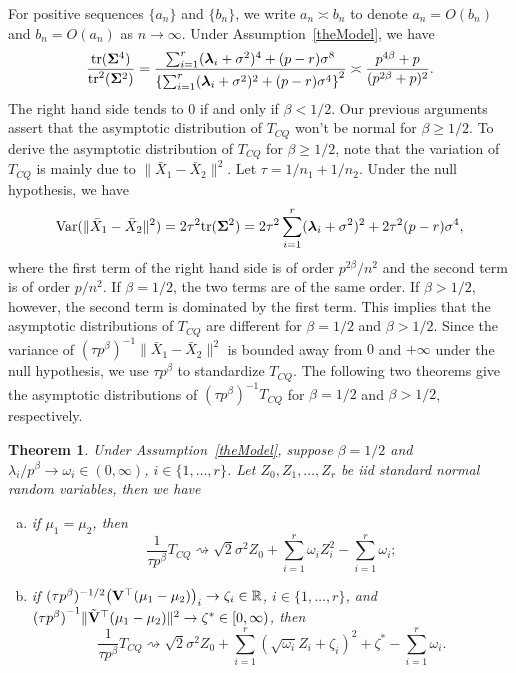 \documentclass[times,sort&compress,3p]{elsarticle}
\newcommand{\mytr}{ {\rm tr} }
\newcommand{\myVar}{ {\rm Var} }
\newcommand{\bfsym}[1]{\ensuremath{\boldsymbol{#1}}}
\def\blambda {\bfsym {\lambda}}        \def\bLambda {\bfsym {\Lambda}}
\theoremstyle{plain}
\newtheorem{theorem}{\quad\quad Theorem}
\theoremstyle{definition}
\theoremstyle{remark}
\begin{document}
For positive sequences $\{a_n\}$ and $\{b_n\}$, we write $a_n\asymp b_n$ to denote $a_n=O(b_n)$ and $b_n=O(a_n)$ as $n\to \infty$.
Under Assumption~\ref{theModel}, we have
$$
\frac{\mytr(\bSigma^4)}{\mytr^2(\bSigma^2)}
=
\frac{\sum_{i=1}^r (\blambda_i+\sigma^2)^4+(p-r)\sigma^8}{\left\{\sum_{i=1}^r (\blambda_i+\sigma^2)^2+(p-r)\sigma^4\right\}^2}
\asymp 
\frac{p^{4\beta}+p}{(p^{2\beta}+p)^2}.
$$
The right hand side tends to $0$ if and only if $\beta<1/2$.
Our previous arguments assert that the asymptotic distribution of $T_{CQ}$ won't be normal for $\beta\geq 1/2$.
To derive the asymptotic distribution of $T_{CQ}$ for $\beta\geq 1/2$,
note that the variation of $T_{CQ}$ is mainly due to $\|\bar{X}_1-\bar{X}_2\|^2$.
Let $\tau=1/n_1+1/n_2$.
Under the null hypothesis, we have
$$
\myVar(\|\bar{X}_1-\bar{X}_2\|^2)=
2\tau^2 \mytr (\bSigma^2)=2\tau^2 \sum_{i=1}^r (\blambda_i+
\sigma^2)^2
+ 2\tau^2 (p-r)\sigma^4,
$$
where the first term of the right hand side is of order $p^{2\beta}/n^2$ and the second term is of order $p/n^2$.
If $\beta=1/2$, the two terms are of the same order. 
If $\beta>1/2$, however, the second term is dominated by the first term.
This implies that the asymptotic distributions of $T_{CQ}$ are different for $\beta=1/2$ and $\beta>1/2$.
Since the variance of $(\tau p^{\beta})^{-1}\|\bar{X}_1-\bar{X}_2\|^2$ is bounded away from $0$ and $+\infty$ under the null hypothesis, we use $\tau p^{\beta}$ to standardize $T_{CQ}$.
The following two theorems give the asymptotic distributions of $(\tau p^{\beta})^{-1}T_{CQ}$ for $\beta= 1/2$ and $\beta>1/2$, respectively.
\begin{theorem}\label{Chenstheory1}
 Under Assumption~\ref{theModel},
 suppose $\beta=1/2$ and $\lambda_i/p^\beta \to \omega_i\in(0,\infty)$, $i\in \{1,\ldots,r\}$.
    Let $Z_{0},Z_1,\ldots,Z_{r}$ be iid standard normal random variables,
     then we have
     \begin{enumerate}[(a)]
         \item
             if $\mu_1=\mu_2$, then
    $$
        \frac{1}{\tau p^{\beta}} T_{CQ}
        \rightsquigarrow
\sqrt{2}\sigma^2 Z_0
+
        \sum_{i=1}^r \omega_i Z_i^2
            -
        \sum_{i=1}^r \omega_i;
    $$
         \item
             if $(\tau p^{\beta})^{-1/2}\big(\mathbf{V}^\top  (\mu_1-\mu_2)\big)_i\to \zeta_i\in \mathbb{R}$, $i\in \{1,\ldots,r\}$,
             and
    ${(\tau p^\beta)}^{-1}\|\tilde{\mathbf{V}}^\top  (\mu_1-\mu_2)\|^2\to \zeta^*\in [0,\infty)$, then
    $$
        \frac{1}{\tau p^{\beta}} T_{CQ}
        \rightsquigarrow
\sqrt{2}\sigma^2 Z_0+
        \sum_{i=1}^r (\sqrt{\omega_i} Z_i+\zeta_i)^2+
\zeta^*
        -
        \sum_{i=1}^r \omega_i.
    $$
     \end{enumerate}
\end{theorem}
\end{document}
